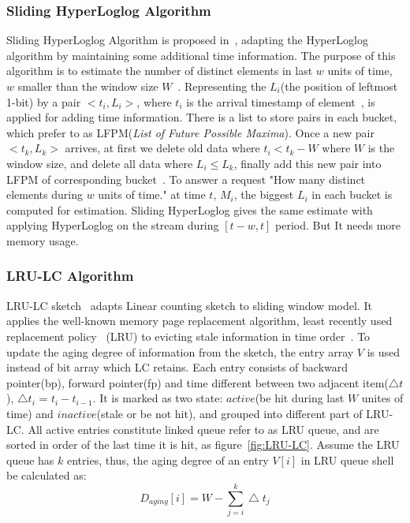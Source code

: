 \subsubsection{Sliding HyperLoglog Algorithm}
Sliding HyperLoglog Algorithm is proposed in~\cite{chabchoub2010sliding},
adapting the HyperLoglog algorithm by maintaining some additional time
information. The purpose of this algorithm is to estimate the number of distinct
elements in last $w$ units of time, $w$ smaller than the window size
$W$~\cite{chabchoub2010sliding}. Representing the $L_i$(the position of leftmost
1-bit) by a pair $<t_i, L_i>$, where $t_i$ is the arrival timestamp of
element~\cite{chabchoub2010sliding}, is applied for adding time information.
There is a list to store pairs in each bucket, which prefer to as
LFPM(\emph{List of Future Possible Maxima}). Once a new pair $<t_k, L_k>$
arrives, at first we delete old data where $t_i < t_k - W$ where $W$ is the
window size, and delete all data where $L_i \leq L_k$, finally add this new pair
into LFPM of corresponding bucket~\cite{chabchoub2010sliding}. To answer a
request "How many distinct elements during $w$ units of time." at time $t$,
$M_i$, the biggest $L_i$ in each bucket is computed for estimation. Sliding
HyperLoglog gives the same estimate with applying HyperLoglog on the stream
during $[t-w, t]$ period. But It needs more memory usage.

\subsubsection{LRU-LC Algorithm}
LRU-LC sketch~\cite{shan2016lru} adapts Linear counting sketch to sliding window
model. It applies the well-known memory page replacement algorithm, least
recently used replacement policy~\cite{o1993lru} (LRU) to evicting stale
information in time order~\cite{shan2016lru}. To update the aging degree of
information from the sketch, the entry array $V$ is used instead of bit array
which LC retains. Each entry consists of backward pointer(bp), forward
pointer(fp) and time different between two adjacent item($\bigtriangleup t$),
$\bigtriangleup t_i$ = $t_i - t_{i-1}$. It is marked as two state: $active$(be
hit during last $W$ unites of time) and $inactive$(stale or be not hit), and
grouped into different part of LRU-LC. All active entries constitute linked
queue refer to as LRU queue, and are sorted in order of the last time it is hit,
as figure~\ref{fig:LRU-LC}. Assume the LRU queue has $k$ entries, thus, the
aging degree of an entry $V[i]$ in LRU queue shell be calculated as:
\begin{equation*}
   D_{aging}[i] = W-\sum_{j=i}^{k}\bigtriangleup t_j
\end{equation*}

